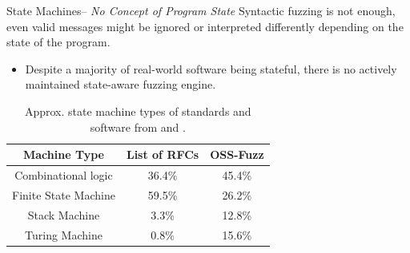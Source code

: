 \begin{frame}{State Machines-- \textit{No Concept of Program State}}
    Syntactic fuzzing is not enough, even valid messages might be ignored or interpreted
    differently depending on the state of the program.
    \begin{itemize}
        \item Despite a majority of real-world software being stateful, there is no
            actively maintained state-aware fuzzing engine.
    \end{itemize}
    \begin{table}
        \begin{footnotesize}
        \begin{tabular}{c|c|c}
            Machine Type & List of RFCs & OSS-Fuzz \\
            \hline
            Combinational logic & 36.4\% & 45.4\%\\
            Finite State Machine & 59.5\% & 26.2\% \\
            Stack Machine & 3.3\% & 12.8\% \\
            Turing Machine & 0.8\% & 15.6\% \\
        \end{tabular}
        \caption{Approx. state machine types of standards and software
            from  and
            .}
        \end{footnotesize}
    \end{table}
    \vspace{-1cm}
\end{frame}


